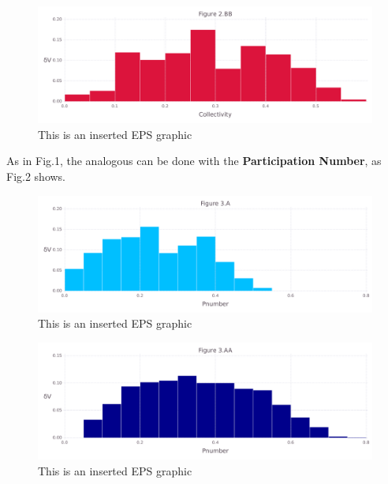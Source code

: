 \documentclass[10pt,letterpaper]{article}
\begin{document}
\begin{figure}[ht]
\begin{center}
\includegraphics[scale=0.5]{1xkk/2bbfigure_very_hi-precision.pdf}
\caption{This is an inserted EPS graphic}
\label{fig6}
\end{center}
\end{figure}

\clearpage
As in Fig.1, the analogous can be done with the \textbf{Participation Number}, as Fig.2 shows.

\begin{figure}[ht]
\begin{center}
\includegraphics[scale=0.5]{1xkk/3afigure_very_hi-precision.pdf}
\caption{This is an inserted EPS graphic}
\label{fig7}
\end{center}
\end{figure}

\begin{figure}[ht]
\begin{center}
\includegraphics[scale=0.5]{1xkk/3aafigure_very_hi-precision.pdf}
\caption{This is an inserted EPS graphic}
\label{fig8}
\end{center}
\end{figure}
\end{document}
